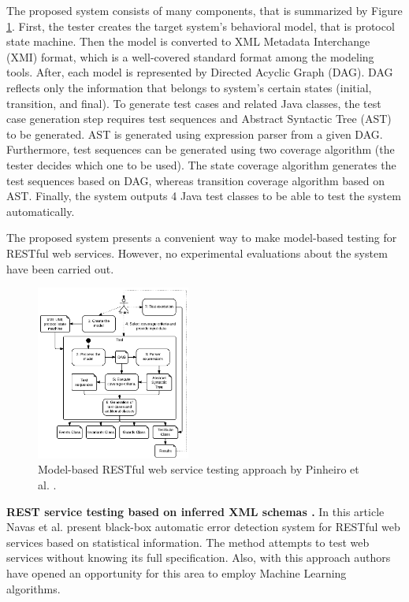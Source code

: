 \documentclass[english]{tktltiki}
\begin{document}
The proposed system consists of many components, that is summarized by Figure \ref{fig:uml_system}. First, the tester creates the target system's behavioral model, that is protocol state machine. Then the model is converted to XML Metadata Interchange (XMI) format, which is a well-covered standard format among the modeling tools. After, each model is represented by Directed Acyclic Graph (DAG). DAG reflects only the information that belongs to system's certain states (initial, transition, and final). To generate test cases and related Java classes, the test case generation step requires test sequences and Abstract Syntactic Tree (AST) to be generated. AST is generated using expression parser from a given DAG. Furthermore, test sequences can be generated using two coverage algorithm (the tester decides which one to be used). The state coverage algorithm generates the test sequences based on DAG, whereas transition coverage algorithm based on AST. Finally, the system outputs 4 Java test classes to be able to test the system automatically.

The proposed system presents a convenient way to make model-based testing for RESTful web services. However, no experimental evaluations about the system have been carried out.

\begin{figure}[h]
	\begin{center}
		\includegraphics[width=0.45\textwidth]{images/uml_system.png}
		\caption{ Model-based RESTful web service testing approach by Pinheiro et al. \cite{pinheiro2013model}. }
		\label{fig:uml_system}
	\end{center}
\end{figure}

\textbf{REST service testing based on inferred XML schemas \cite{navas2014rest}.} In this article Navas et al. \cite{navas2014rest} present black-box automatic error detection system for RESTful web services based on statistical information. The method attempts to test web services without knowing its full specification. Also, with this approach authors have opened an opportunity for this area to employ Machine Learning algorithms.
\end{document}
